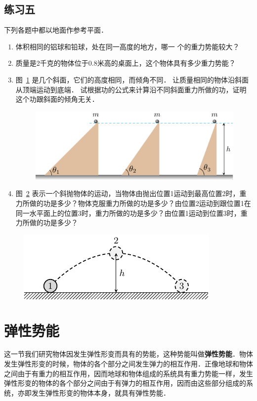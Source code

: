 \subsection*{练习五}
下列各题中都以地面作参考平面．
\begin{enumerate}
    \item 体积相同的铝球和铅球，处在同一高度的地方，哪一
    个的重力势能较大？
    \item 质量是2千克的物体位于0.8米高的桌面上，这个物体具有多少重力势能？
    \item 图~\ref{fig_A_7-15} 是几个斜面，它们的高度相同，而倾角不同．
    让质量相同的物体沿斜面从顶端运动到底端．
    试根据功的公式来计算沿不同斜面重力所做的功，证明这个功跟斜面的倾角无关．
\begin{figure}[htbp]
    \centering
    \includegraphics{fig/A/7-15.pdf}
    \caption{}\label{fig_A_7-15}
\end{figure}
\item 图~\ref{fig_A_7-16} 表示一个斜抛物体的运动，当物体由抛出位置1运动到最高位置2时，重力所做的功是多少？物体克服重力所做的功是多少？由位置2运动到跟位置1在同一水平面上的位置3时，重力所做的功是多少？由位置1运动到位置3时，重力所做的功是多少？
\end{enumerate}

\begin{figure}[htbp]
    \centering
    \includegraphics{fig/A/7-16.pdf}
    \caption{}\label{fig_A_7-16}
\end{figure}


\section{弹性势能}
这一节我们研究物体因发生弹性形变而具有的势能，这种势能叫做\textbf{弹性势能}．物体发生弹性形变的时候，物体的各个部分之间发生弹力的相互作用．正像地球和物体之间由于有重力的相互作用，因而地球和物体组成的系统具有重力势能一样，发生弹性形变的物体的各个部分之间由于有弹力的相互作用，因而由这些部分组成的系统，亦即发生弹性形变的物体本身，就具有弹性势能．

